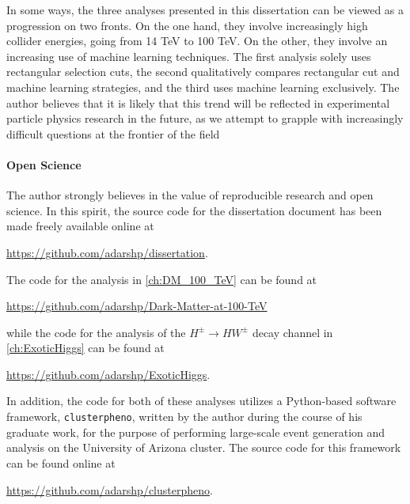 In some ways, the three analyses presented in this dissertation can be viewed as a progression on two fronts. On the one hand, they involve increasingly high collider energies, going from 14 TeV to 100 TeV. On the other, they involve an increasing use of machine learning techniques. The first analysis solely uses rectangular selection cuts, the second qualitatively compares rectangular cut and machine learning strategies, and the third uses machine learning exclusively. The author believes that it is likely that this trend will be reflected in experimental particle physics research in the future, as we attempt to grapple with increasingly difficult questions at the frontier of the field

\paragraph{Open Science} The author strongly believes in the value of reproducible research and open science. In this spirit, the source code for the dissertation document has been made freely available online at

\url{https://github.com/adarshp/dissertation}.

\noindent The code for the analysis in \autoref{ch:DM_100_TeV} can be found at

\url{https://github.com/adarshp/Dark-Matter-at-100-TeV}

\noindent while the code for the analysis of the $H^\pm\rightarrow HW^\pm$ decay channel in \autoref{ch:ExoticHiggs} can be found at

\url{https://github.com/adarshp/ExoticHiggs}.

\noindent In addition, the code for both of these analyses utilizes a Python-based software framework, \texttt{clusterpheno}, written by the author during the course of his graduate work, for the purpose of performing large-scale event generation and analysis on the University of Arizona cluster. The source code for this framework can be found online at 

\url{https://github.com/adarshp/clusterpheno}.

